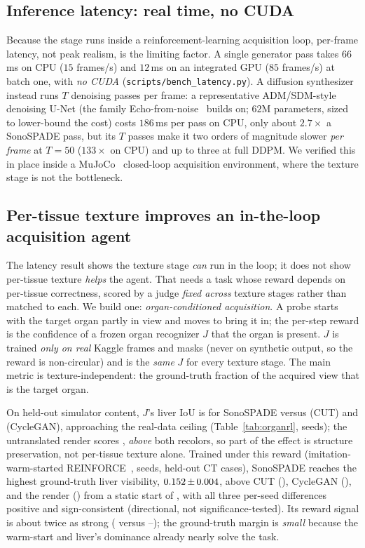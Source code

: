 \documentclass[runningheads]{llncs}
\begin{document}
\subsection{Inference latency: real time, no CUDA}
\label{sec:latency}
Because the stage runs inside a reinforcement-learning acquisition loop, per-frame latency, not peak realism, is the limiting factor. A single generator pass takes $66$\,ms on CPU ($15$ frames/s) and $12$\,ms on an integrated GPU ($85$ frames/s) at batch one, with \emph{no CUDA} (\texttt{scripts/bench\_latency.py}). 
A diffusion synthesizer instead runs $T$ denoising passes per frame: a representative ADM/SDM-style denoising U-Net (the family Echo-from-noise~\cite{stojanovski2023echofromnoise} builds on; $62$M parameters, sized to lower-bound the cost) costs $186$\,ms per pass on CPU, only about $2.7\times$ a SonoSPADE pass, but its $T$ passes make it two orders of magnitude slower \emph{per frame} at $T{=}50$ ($133\times$ on CPU) and up to three at full DDPM. 
We verified this in place inside a MuJoCo~\cite{todorov2012mujoco} closed-loop acquisition environment, where the texture stage is not the bottleneck.

\subsection{Per-tissue texture improves an in-the-loop acquisition agent}
\label{sec:organrl}
The latency result shows the texture stage \emph{can} run in the loop; it does not show per-tissue texture
\emph{helps} the agent. That needs a task whose reward depends on per-tissue correctness, scored by a judge
\emph{fixed across} texture stages rather than matched to each. We build one: \emph{organ-conditioned acquisition}. 
A probe starts with the target organ partly in view and moves to bring it in; the per-step reward is the confidence of a frozen organ recognizer $J$ that the organ is present. $J$ is trained \emph{only on real} Kaggle frames and masks (never on synthetic output, so the reward is non-circular) and is the \emph{same} $J$ for every texture stage. The main metric is texture-independent: the ground-truth fraction of the acquired view that is the target organ.

On held-out simulator content, $J$'s liver IoU is \recSono{} for SonoSPADE versus \recCut{} (CUT) and \recCyc{} (CycleGAN), approaching the real-data ceiling \recCeil{} (Table~\ref{tab:organrl}, \rlSeeds{} seeds); the untranslated render scores \recPhys{}, \emph{above} both recolors, so part of the effect is structure preservation, not per-tissue texture alone. 
Trained under this reward (imitation-warm-started REINFORCE~\cite{williams1992reinforce}, \rlSeeds{} seeds, held-out CT cases), SonoSPADE reaches the highest ground-truth liver visibility, $0.152\,{\pm}\,0.004$, above CUT (\rlCut{}), CycleGAN (\rlCyc{}), and the render (\rlPhys{}) from a static start of \rlStart{}, with all three per-seed differences positive and sign-consistent (directional, not significance-tested). 
Its reward signal is about twice as strong (\rewSono{} versus \rewCut{}--\rewPhys{}); the ground-truth margin is \emph{small} because the warm-start and liver's dominance already nearly solve the task. 
\end{document}
